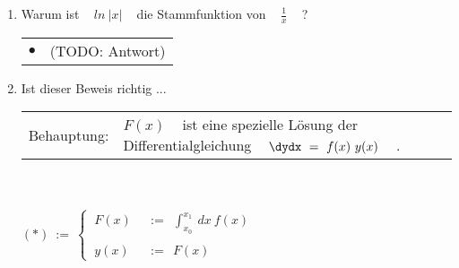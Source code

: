 \begin{enumerate}
%	
%	
	
	
	\newpage
	
	
	\item Warum ist ~ $ln ~ \left| x \right|$ ~ die Stammfunktion von ~ $\frac{1}{x}$ ~ ? \\
	
	\begin{tabularx}{0.88\textwidth}{lX}
		$\bullet$ & (TODO: Antwort)
	\end{tabularx}
	
	
	\newpage
	
	
	\item Ist dieser Beweis richtig  ... ~\\
	
	\begin{tabularx}{0.88\textwidth}{lX}
		Behauptung: & $F(x)$ ~ ist eine spezielle Lösung der Differentialgleichung ~ $\dydx ~ = ~ f(x) ~ y(x)$ ~ .
	\end{tabularx}
	 
	~\\
	~\\
	
	$ (*) ~ := ~ \begin{cases}
	~ F(x) ~~ &:= ~~ \int_{x_0}^{x_1} ~ dx ~ f(x) \\ \\
	~ y(x) ~~ &:= ~~ F(x)
	\end{cases}$ \\
	
	~\\
	

\end{enumerate}
